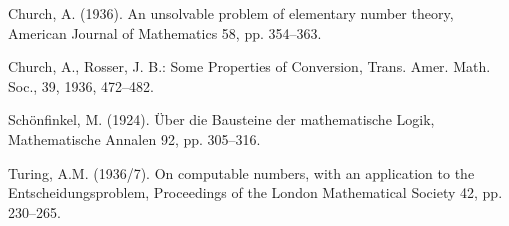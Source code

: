 \begin{thebibliography}{99}

 Church, A. (1936). An unsolvable problem of elementary number theory, American
Journal of Mathematics 58, pp. 354–363.

 Church, A., Rosser, J. B.: Some Properties of Conversion, Trans. Amer. Math. Soc., 39, 1936, 472–482.

 Schönfinkel, M. (1924). Über die Bausteine der mathematische Logik, Mathematische
Annalen 92, pp. 305–316.

 Turing, A.M. (1936/7). On computable numbers, with an application to the
Entscheidungsproblem, Proceedings of the London Mathematical Society
42, pp. 230–265.

\end{thebibliography}
